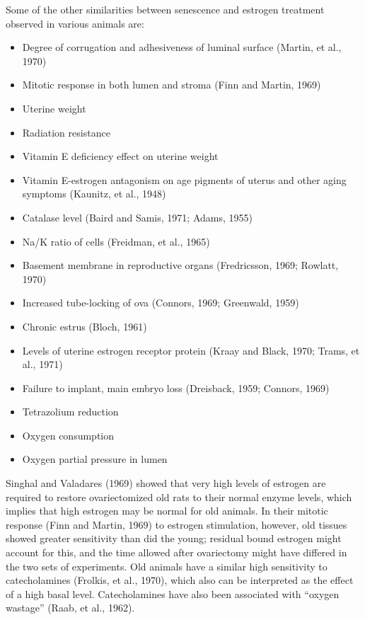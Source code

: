 Some of the other similarities between senescence and estrogen treatment observed in various animals are:

\begin{center}
\begin{adjustwidth}{0.1\linewidth}{0.1\linewidth}
\begin{itemize}[label={}, leftmargin=*, rightmargin=0pt]
    \item Degree of corrugation and adhesiveness of luminal surface (Martin, et al., 1970)
    \item Mitotic response in both lumen and stroma (Finn and Martin, 1969)
    \item Uterine weight
    \item Radiation resistance
    \item Vitamin E deficiency effect on uterine weight
    \item Vitamin E-estrogen antagonism on age pigments of uterus and other aging symptoms (Kaunitz, et al., 1948)
    \item Catalase level (Baird and Samis, 1971; Adams, 1955)
    \item Na/K ratio of cells (Freidman, et al., 1965)
    \item Basement membrane in reproductive organs (Fredricsson, 1969; Rowlatt, 1970)
    \item Increased tube-locking of ova (Connors, 1969; Greenwald, 1959)
    \item Chronic estrus (Bloch, 1961)
    \item Levels of uterine estrogen receptor protein (Kraay and Black, 1970; Trams, et al., 1971)
    \item Failure to implant, main embryo loss (Dreisback, 1959; Connors, 1969)
    \item Tetrazolium reduction
    \item Oxygen consumption
    \item Oxygen partial pressure in lumen
\end{itemize}
\end{adjustwidth}
\end{center}

Singhal and Valadares (1969) showed that very high levels of estrogen are required to restore ovariectomized old rats to their normal enzyme levels, which implies that high estrogen
may be normal for old animals. In their mitotic response (Finn and Martin, 1969) to estrogen stimulation, however, old tissues showed greater sensitivity than did the young; residual
bound estrogen might account for this, and the time allowed after ovariectomy might have differed in the two sets of experiments. Old animals have a similar high sensitivity to catecholamines
(Frolkis, et al., 1970), which also can be interpreted as the effect of a high basal level. Catecholamines have also been associated with ``oxygen wastage'' (Raab, et al., 1962).

